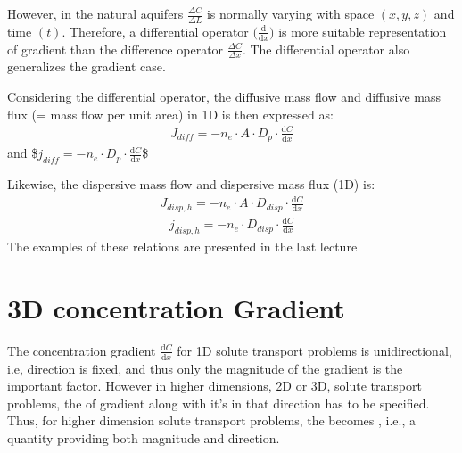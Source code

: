 \documentclass[letterpaper,10pt,english]{jupyterBook}
\begin{document}
\sphinxAtStartPar
However, in the natural aquifers \(\frac{\Delta C}{\Delta L}\) is normally varying with space \((x,y,z)\) and time \((t)\). Therefore, a differential operator \(\big(\frac{\mathrm{d}}{\mathrm{d} x}\big)\) is more suitable representation of gradient than the difference operator \(\frac{\Delta C}{\Delta x}\). The differential operator also generalizes the gradient case.

\sphinxAtStartPar
Considering the differential operator, the diffusive mass flow and diffusive mass flux (= mass flow per unit area) in 1D is then expressed as:
\begin{equation*}
\begin{split}
J_{diff} = - n_e \cdot A \cdot D_p \cdot \frac{\mathrm{d} C}{\mathrm{d}x} 
\end{split}
\end{equation*}
\sphinxAtStartPar
and
\$\(
j_{diff} = - n_e \cdot D_p \cdot \frac{\mathrm{d} C}{\mathrm{d}x} 
\)\$

\sphinxAtStartPar
Likewise, the dispersive mass flow and dispersive mass flux (1\sphinxhyphen{}D) is:
\begin{equation*}
\begin{split}
J_{disp, h} = - n_e \cdot A \cdot D_{disp} \cdot \frac{\mathrm{d} C}{\mathrm{d}x} 
\end{split}
\end{equation*}\begin{equation*}
\begin{split}
j_{disp, h} = - n_e \cdot D_{disp} \cdot \frac{\mathrm{d} C}{\mathrm{d}x} 
\end{split}
\end{equation*}
\sphinxAtStartPar
The examples of these relations are presented in the last lecture 


\section{3\sphinxhyphen{}D concentration Gradient}
\label{\detokenize{content/transport/L10/22_reactive_transport:d-concentration-gradient}}
\sphinxAtStartPar
The concentration gradient  \(\frac{\mathrm{d}C}{\mathrm{d}x}\)  for 1\sphinxhyphen{}D solute transport problems is uni\sphinxhyphen{}directional, i.e, direction is fixed, and thus only the magnitude of the gradient is the important factor. However in higher dimensions, 2\sphinxhyphen{}D or 3\sphinxhyphen{}D, solute transport problems, the  of gradient along with it’s  in that direction has to be specified. Thus, for higher dimension solute transport problems, the  becomes , i.e., a quantity providing both magnitude and direction.
\end{document}

